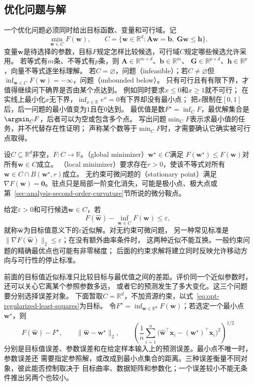 \subsection{优化问题与解}
\label{sec:opt-problem-and-solutions}
\label{sec:opt-error-objects}

一个优化问题必须同时给出目标函数、变量和可行域。记
\[
  \min_{\bm{w}\in C}F(\bm{w}),\qquad
  C=\{\bm{w}\in\mathbb{R}^d:
  \bm{A}\bm{w}=\bm{b},\ \bm{G}\bm{w}\leq\bm{h}\}.
\]
变量$\bm w$是待选择的参数，目标$F$规定怎样比较候选，可行域$C$规定哪些候选允许采用。
若等式有$m$条、不等式有$p$条，则
$\bm A\in\mathbb R^{m\times d}$、$\bm b\in\mathbb R^m$、
$\bm G\in\mathbb R^{p\times d}$、$\bm h\in\mathbb R^p$，向量不等式逐坐标理解。
若$C=\varnothing$，问题（infeasible）；若$C\neq\varnothing$但
$\inf_{\bm{w}\in C}F(\bm{w})=-\infty$，问题（unbounded below）。
只有可行且有有限下界，才值得继续问下确界是否由某个点达到。
例如同时要求$x\leq0$和$x\geq1$就不可行；
在实线上最小化$x$无下界，$\inf_{x\in\mathbb R}e^x=0$有下界却没有最小点；
把$x$限制在$[0,1]$后，后一问题的最小值变为$1$且在$0$达到。
最优值是数$F^\star=\inf_C F$，最优解集合是$\argmin_C F$，后者可以为空或包含多个点。
写出问题$\min_C F$表示求最小值的任务，并不代替存在性证明；
声称某个数等于$\min_C F$时，才需要确认它确实被可行点取得。

\begin{definition}
\label{def:opt-solutions-stationarity}
设$C\subseteq\mathbb R^d$非空，$F:C\to\mathbb R$。（global minimizer）$\bm{w}^{\star}\in C$满足
$F(\bm{w}^{\star})\leq F(\bm{w})$对所有$\bm{w}\in C$成立。
（local minimizer）要求存在$r>0$，使该不等式对所有
$\bm w\in C\cap B(\bm w^\star,r)$成立。
无约束可微问题的（stationary point）满足
$\nabla F(\bm{w})=\bm{0}$。驻点只是局部一阶变化消失，可能是极小点、极大点或
第~\ref{sec:analysis-second-order-curvature}节所说的微分鞍点。
\end{definition}
给定$\varepsilon>0$和可行候选$\widehat{\bm w}\in C$，若
\[
  F(\widehat{\bm{w}})-\inf_{\bm{w}\in C}F(\bm{w})\leq\varepsilon,
\]
就称$\widehat{\bm{w}}$为目标值意义下的$\varepsilon$近似解。对无约束可微问题，
另一种常见标准是
$\lVert\nabla F(\widehat{\bm{w}})\rVert_2\leq\varepsilon$；在没有额外曲率条件时，
这两种近似不能互换。一般约束问题的精确最优点也可能有非零梯度；
后面的约束求解将建立同时反映允许移动方向与可行性的停止标准。

前面的目标值近似标准只比较目标与最优值之间的差距。评价同一个近似参数时，还可以关心它离某个参照参数多远，
或者它的预测发生了多大变化。这三个问题要分别选择误差对象。
下面暂取$C=\mathbb{R}^d$，不加资源约束，以式~\eqref{eq:opt-regularized-least-squares}为目标。
令$F^\star=\inf_{\bm{w}\in\mathbb{R}^d}F(\bm{w})$；若选定一个最小点
$\bm{w}^\star$，则
\[
  F(\widehat{\bm{w}})-F^\star,\qquad
  \lVert\widehat{\bm{w}}-\bm{w}^\star\rVert_2,\qquad
  \left(
    \frac{1}{n}\sum_{i=1}^{n}
    \bigl(
      \widehat{\bm{w}}^{\top}\bm{x}_i
      -(\bm{w}^\star)^{\top}\bm{x}_i
    \bigr)^2
  \right)^{1/2}
\]
分别是目标值误差、参数误差和在给定样本输入上的预测误差。最小点不唯一时，参数误差还
需要指定参照解，或改成到最小点集合的距离。三种误差衡量不同对象，彼此能否控制取决于
目标曲率、数据矩阵和参数化；一个误差较小不能无条件推出另两个也较小。

